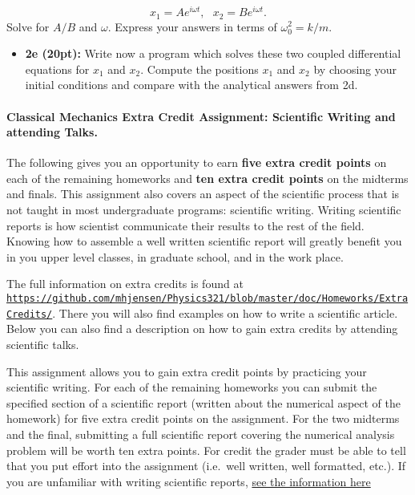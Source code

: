 \documentclass[%
oneside,                 %
final,                   %
10pt]{article}
\begin{document}
\noindent
\[
x_1=Ae^{i\omega t},~~~x_2=Be^{i\omega t}.
\]
Solve for $A/B$ and $\omega$. Express your answers in terms of $\omega_0^2=k/m$.

\begin{itemize}
\item \textbf{2e (20pt):} Write now a program which solves these two coupled differential equations for $x_1$ and $x_2$. Compute the positions $x_1$ and $x_2$ by choosing your initial conditions and compare with the analytical answers from 2d.   
\end{itemize}

\noindent
\paragraph{Classical Mechanics Extra Credit Assignment: Scientific Writing and attending Talks.}
The following gives you an opportunity to earn \textbf{five extra credit
points} on each of the remaining homeworks and \textbf{ten extra credit points}
on the midterms and finals.  This assignment also covers an aspect of
the scientific process that is not taught in most undergraduate
programs: scientific writing.  Writing scientific reports is how
scientist communicate their results to the rest of the field.  Knowing
how to assemble a well written scientific report will greatly benefit
you in you upper level classes, in graduate school, and in the work
place.

The full information on extra credits is found at \href{{https://github.com/mhjensen/Physics321/blob/master/doc/Homeworks/ExtraCredits/}}{\nolinkurl{https://github.com/mhjensen/Physics321/blob/master/doc/Homeworks/ExtraCredits/}}. There you will also find examples on how to write a scientific article. 
Below you can also find a description on how to gain extra credits by attending scientific talks.


This assignment allows you to gain extra credit points by practicing
your scientific writing.  For each of the remaining homeworks you can
submit the specified section of a scientific report (written about the
numerical aspect of the homework) for five extra credit points on the
assignment.  For the two midterms and the final, submitting a full
scientific report covering the numerical analysis problem will be
worth ten extra points.  For credit the grader must be able to tell
that you put effort into the assignment (i.e.~well written, well
formatted, etc.).  If you are unfamiliar with writing scientific
reports, \href{{https://github.com/mhjensen/Physics321/blob/master/doc/Homeworks/ExtraCredits/IntroductionScientificWriting.md}}{see the information here}
\end{document}
